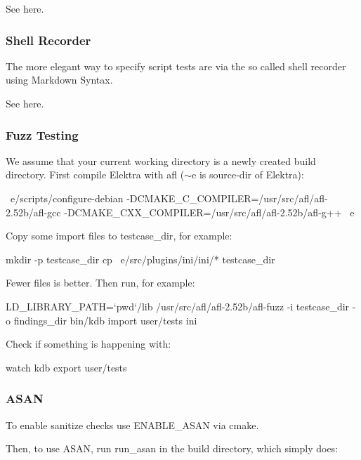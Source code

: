 See here.

\subsubsection*{Shell Recorder}

The more elegant way to specify script tests are via the so called shell recorder using Markdown Syntax.

See here.

\subsubsection*{Fuzz Testing}

We assume that your current working directory is a newly created build directory. First compile Elektra with afl ($\sim$e is source-\/dir of Elektra)\+: \begin{DoxyVerb}~e/scripts/configure-debian -DCMAKE_C_COMPILER=/usr/src/afl/afl-2.52b/afl-gcc -DCMAKE_CXX_COMPILER=/usr/src/afl/afl-2.52b/afl-g++ ~e
\end{DoxyVerb}


Copy some import files to {\ttfamily testcase\+\_\+dir}, for example\+: \begin{DoxyVerb}mkdir -p testcase_dir
cp ~e/src/plugins/ini/ini/* testcase_dir
\end{DoxyVerb}


Fewer files is better. Then run, for example\+: \begin{DoxyVerb}LD_LIBRARY_PATH=`pwd`/lib /usr/src/afl/afl-2.52b/afl-fuzz -i testcase_dir -o findings_dir bin/kdb import user/tests ini
\end{DoxyVerb}


Check if something is happening with\+: \begin{DoxyVerb}watch kdb export user/tests
\end{DoxyVerb}


\subsubsection*{A\+S\+AN}

To enable sanitize checks use {\ttfamily E\+N\+A\+B\+L\+E\+\_\+\+A\+S\+AN} via cmake.

Then, to use A\+S\+AN, run {\ttfamily run\+\_\+asan} in the build directory, which simply does\+: 


